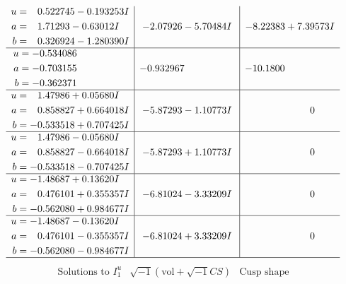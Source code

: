 \documentclass[1p]{elsarticle_modified}
\theoremstyle{definition}
\newcommand{\I}{\sqrt{-1}}
\begin{document}
$$\begin{array}{c|c|c}
\begin{aligned}
u &= \phantom{-}0.522745 - 0.193253 I \\
a &= \phantom{-}1.71293 - 0.63012 I \\
b &= \phantom{-}0.326924 - 1.280390 I\end{aligned}
 & -2.07926 - 5.70484 I & -8.22383 + 7.39573 I \\ \hline\begin{aligned}
u &= -0.534086\phantom{ +0.000000I} \\
a &= -0.703155\phantom{ +0.000000I} \\
b &= -0.362371\phantom{ +0.000000I}\end{aligned}
 & -0.932967\phantom{ +0.000000I} & -10.1800\phantom{ +0.000000I} \\ \hline\begin{aligned}
u &= \phantom{-}1.47986 + 0.05680 I \\
a &= \phantom{-}0.858827 + 0.664018 I \\
b &= -0.533518 + 0.707425 I\end{aligned}
 & -5.87293 - 1.10773 I & \phantom{-0.000000 } 0 \\ \hline\begin{aligned}
u &= \phantom{-}1.47986 - 0.05680 I \\
a &= \phantom{-}0.858827 - 0.664018 I \\
b &= -0.533518 - 0.707425 I\end{aligned}
 & -5.87293 + 1.10773 I & \phantom{-0.000000 } 0 \\ \hline\begin{aligned}
u &= -1.48687 + 0.13620 I \\
a &= \phantom{-}0.476101 + 0.355357 I \\
b &= -0.562080 + 0.984677 I\end{aligned}
 & -6.81024 - 3.33209 I & \phantom{-0.000000 } 0 \\ \hline\begin{aligned}
u &= -1.48687 - 0.13620 I \\
a &= \phantom{-}0.476101 - 0.355357 I \\
b &= -0.562080 - 0.984677 I\end{aligned}
 & -6.81024 + 3.33209 I & \phantom{-0.000000 } 0\\
 \hline 
 \end{array}$$\newpage$$\begin{array}{c|c|c}  
\text{Solutions to }I^u_{1}& \I (\text{vol} + \sqrt{-1}CS) & \text{Cusp shape}\\
 \hline 
\begin{aligned}

\end{aligned}
\end{array}$$
\end{document}
